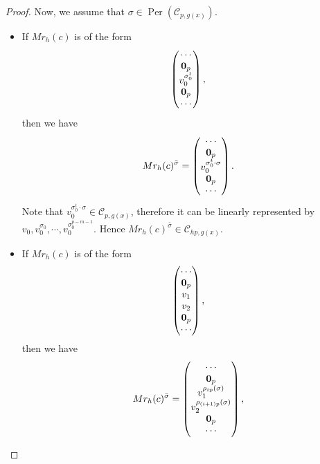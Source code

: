 \documentclass[journal,12pt,onecolumn]{IEEEtran}
\begin{document}
\begin{proof}
    Now, we assume that $\sigma\in \operatorname{Per}(\mathcal{C}_{p,g(x)})$. 
    \begin{itemize}
        \item If $Mr_{h}(c)$ is of the form
        \[
            \begin{pmatrix}
                \cdots \\
                {\bf 0}_p \\
                v_0^{\sigma_0^t} \\
                {\bf 0}_p \\
                \cdots
            \end{pmatrix},
        \]
        then we have
        \[
            Mr_{h}(c)^{\bar{\sigma}} = \begin{pmatrix}
                \cdots \\
                {\bf 0}_p \\
                v_0^{\sigma_0^t\cdot\sigma} \\
                {\bf 0}_p \\
                \cdots
            \end{pmatrix}.
        \]
        Note that $v_0^{\sigma_0^t\cdot\sigma}\in\mathcal{C}_{p,g(x)}$, therefore it can be linearly represented by $v_0,v_0^{\sigma_0},\cdots,v_0^{\sigma_0^{p-m-1}}$. Hence $Mr_{h}(c)^{\bar{\sigma}}\in \mathcal{C}_{hp,g(x)}$. 
        \item If $Mr_{h}(c)$ is of the form
        \[
            \begin{pmatrix}
                \cdots \\
                {\bf 0}_p \\
                v_1 \\
                v_2 \\
                {\bf 0}_p \\
                \cdots
            \end{pmatrix},
        \]
        then we have
        \[
            Mr_{h}(c)^{\bar{\sigma}} = \begin{pmatrix}
                \cdots \\
                {\bf 0}_p \\
                v_1^{\rho_{ip}(\sigma)} \\
                v_2^{\rho_{(i+1)p}(\sigma)} \\
                {\bf 0}_p \\
                \cdots
            \end{pmatrix},
\]
\end{itemize}
\end{proof}
\end{document}
